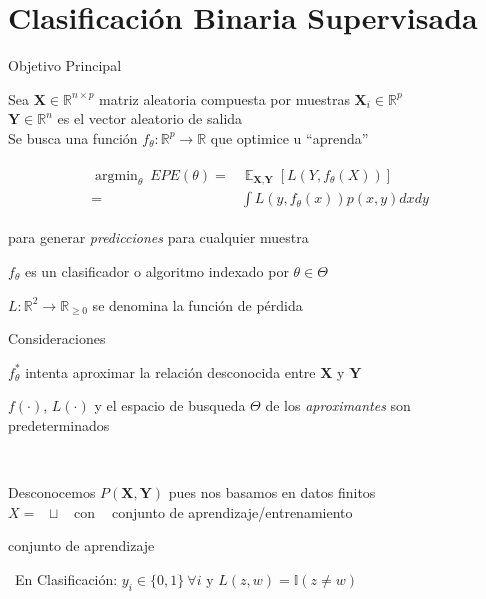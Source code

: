 \documentclass[xcolor=x11names]{beamer}
\DeclareMathOperator{\Expect}{\mathbb{E}}
\DeclareMathOperator{\trainsetn}{\mathcal{T}^{(n)}}
\DeclareMathOperator{\testsetn}{\mathcal{T_s}^{(n)}}
\begin{document}
%

\section{Clasificación Binaria Supervisada}

\begin{frame}{Objetivo Principal}
		\centering

		Sea $\textbf{X} \in \mathbb{R}^{n \times p}$ matriz aleatoria compuesta por muestras $\textbf{X}_i \in \mathbb{R}^{p}$\\
		$\textbf{Y} \in \mathbb{R}^n$ es el vector aleatorio de salida \\
		Se busca una función $f_\theta: \mathbb{R}^{p} \rightarrow  \mathbb{R}$ que optimice u ``aprenda''

	\begin{align*}%
		\begin{split}
		\operatorname{argmin}_{\theta} \  EPE(\theta) = & \Expect_{\textbf{X},\textbf{Y}} \left[ L(Y,f_\theta(X))\right]  \\
			= & \int L(y,f_\theta (x)) p(x,y) dx dy
		\end{split}
	\end{align*}

	para generar \textit{predicciones} para cualquier muestra

	\smallskip
	$f_\theta$ es un clasificador o algoritmo indexado por $\theta \in \Theta$

	\smallskip
	$L: \mathbb{R}^{2} \rightarrow  \mathbb{R}_{\geq 0}$ se denomina la función de pérdida


\end{frame}

\begin{frame}{Consideraciones}

	$f_\theta^*$ intenta aproximar la relación desconocida entre $\textbf{X}$ y $\textbf{Y}$

	\bigskip

	$f(\cdot)$, $L(\cdot)$ y el espacio de busqueda $\Theta$ de los \textit{aproximantes} son predeterminados

	\bigskip\
	
	Desconocemos $P(\textbf{X},\textbf{Y})$ pues nos basamos en datos finitos\\

	$X = \trainsetn  \sqcup \testsetn $ con $\trainsetn$ conjunto de aprendizaje/entrenamiento

	$$\testsetn$$ conjunto de aprendizaje

	\bigskip\
	En Clasificación: $y_i \in \{0,1\} \ \forall  i$ y $L(z,w) =  \mathbb{I}(z \neq w ) $

\end{frame}
\end{document}
